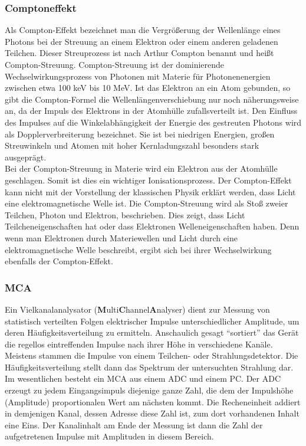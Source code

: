 \documentclass[12pt]{article}
\begin{document}
\subsubsection{Comptoneffekt}
Als Compton-Effekt bezeichnet man die Vergrößerung der Wellenlänge eines Photons bei der Streuung an einem Elektron oder einem anderen geladenen Teilchen. Dieser Streuprozess ist nach Arthur Compton benannt und heißt Compton-Streuung.
Compton-Streuung ist der dominierende Wechselwirkungsprozess von Photonen mit Materie für Photonenenergien zwischen etwa 100 keV bis 10 MeV. Ist das Elektron an ein Atom gebunden, so gibt die Compton-Formel die Wellenlängenverschiebung nur noch näherungsweise an, da der Impuls des Elektrons in der Atomhülle zufallsverteilt ist. Den Einfluss des Impulses auf die Winkelabhängigkeit der Energie des gestreuten Photons wird als Dopplerverbreiterung bezeichnet. Sie ist bei niedrigen Energien, großen Streuwinkeln und Atomen mit hoher Kernladungszahl besonders stark ausgeprägt.\\

Bei der Compton-Streuung in Materie wird ein Elektron aus der Atomhülle geschlagen. Somit ist dies ein wichtiger Ionisationsprozess. Der Compton-Effekt kann nicht mit der Vorstellung der klassischen Physik erklärt werden, dass Licht eine elektromagnetische Welle ist. Die Compton-Streuung wird als Stoß zweier Teilchen, Photon und Elektron, beschrieben. Dies zeigt, dass Licht Teilcheneigenschaften hat oder dass Elektronen Welleneigenschaften haben. Denn wenn man Elektronen durch Materiewellen und Licht durch eine elektromagnetische Welle beschreibt, ergibt sich bei ihrer Wechselwirkung ebenfalls der Compton-Effekt.

\subsubsection{MCA}
Ein Vielkanalanalysator (\textbf{M}ulti\textbf{C}hannel\textbf{A}nalyser) dient zur Messung von statistisch verteilten Folgen elektrischer Impulse unterschiedlicher Amplitude, um deren Häufigkeitsverteilung zu ermitteln. Anschaulich gesagt "`sortiert"' das Gerät die regellos eintreffenden Impulse nach ihrer Höhe in verschiedene Kanäle. Meistens stammen die Impulse von einem Teilchen- oder Strahlungsdetektor. Die Häufigkeitsverteilung stellt dann das Spektrum der untersuchten Strahlung dar.\\

Im wesentlichen besteht ein MCA aus einem ADC und einem PC.
Der ADC erzeugt zu jedem Eingangsimpuls diejenige ganze Zahl, die dem der Impulshöhe (Amplitude) proportionalen Wert am nächsten kommt. Die Recheneinheit addiert in demjenigen Kanal, dessen Adresse diese Zahl ist, zum dort vorhandenen Inhalt eine Eins. Der Kanalinhalt am Ende der Messung ist dann die Zahl der aufgetretenen Impulse mit Amplituden in diesem Bereich.
\end{document}
